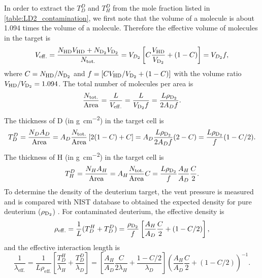 \documentclass[../main.tex]{subfiles}
\begin{document}
In order to extract the $T_D^D$ and $T^D_H$ from the mole fraction listed in \cref{table:LD2_contamination},
we first note that the volume of a  molecule is about \num{1.094} times the volume of a 
molecule. Therefore the effective volume of molecules in the target is
\begin{equation}
	V_{\mathrm{eff.}}=\frac{N_{\ce{HD}} V_{\ce{HD}} + N_{\ce{D_2}} V_{\ce{D_2}}}{N_{\text{tot.}}}
	=V_{D_2} \left[ C \frac{V_{\ce{HD}}}{V_{\ce{D_2}}} + (1-C) \right]
	=V_{D_2} f,
\end{equation}
where $C=N_{\ce{HD}}/N_{\ce{D_2}}$ and $f=\left[ C V_{\ce{HD}}/V_{\ce{D_2}} + (1-C) \right]$ with the
volume ratio $V_{\ce{HD}}/V_{\ce{D_2}}=1.094$.
The total number of molecules per area is
\begin{equation}
	\frac{N_{\mathrm{tot.}}}{\mathrm{Area}} = \frac{L}{V_{\mathrm{eff.}}}
	= \frac{L}{V_{\ce{D_2}}f}=\frac{L\rho_{\ce{D_2}}}{2A_Df}.
\end{equation}
The thickness of D (in \unit{\g\per\cm\squared}) in the target cell is
\begin{equation}
	T_D^D = \frac{N_D A_D}{\mathrm{Area}} = A_D\frac{N_{\mathrm{tot.}}}{\mathrm{Area}} \left[ 2(1-C) + C \right]
	=A_D \frac{L\rho_{\ce{D_2}}}{2A_Df}(2-C)
	=\frac{L\rho_{\ce{D_2}}}{f}(1-C/2).
\end{equation}
The thickness of H (in \unit{\g\per\cm\squared}) in the target cell is
\begin{equation}
	T^D_H = \frac{N_H A_H}{\mathrm{Area}} = A_H\frac{N_{\mathrm{tot.}}}{\mathrm{Area}}C
	=\frac{L\rho_{\ce{D_2}}}{f}\frac{A_H}{A_D}\frac{C}{2}.
	\label{eq:TDH}
\end{equation}
To determine the density of the deuterium target, the vent pressure is measured and is compared
with NIST database to obtained the expected density for pure deuterium ($\rho_{\ce{D_2}}$) \cite{density-1453}.
For contaminated deuterium, the effective density is
\begin{equation}
	\rho_{\mathrm{eff.}} = \frac{1}{L} (T_D^H + T_D^D)
	=\frac{\rho_{\ce{D_2}}}{f} \left[ \frac{A_H}{A_D}\frac{C}{2}+(1-C/2) \right],
\end{equation}
and the effective interaction length is
\begin{equation}
	\frac{1}{\lambda_{\mathrm{eff.}}} = \frac{1}{L\rho_{\mathrm{eff.}}} \left[\frac{T_D^H}{\lambda_H} +\frac{T_D^D}{\lambda_D}\right]
	=\left[\frac{A_H}{A_D}\frac{C}{2\lambda_H} + \frac{1-C/2}{\lambda_D}\right]\left( \frac{A_H}{A_D}\frac{C}{2} +(1-C/2)\right)^{-1}.
\end{equation}
\end{document}
